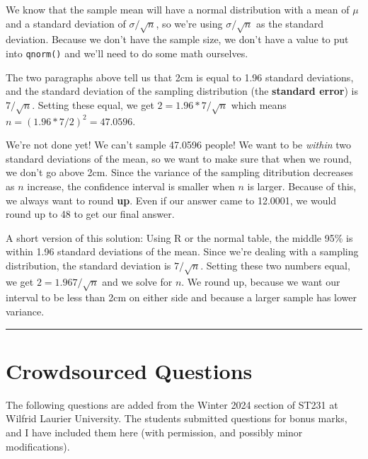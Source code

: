 \documentclass[
  letterpaper,
  DIV=11,
  numbers=noendperiod,
  oneside]{scrreprt}
\begin{document}
We know that the sample mean will have a normal distribution with a mean
of \(\mu\) and a standard deviation of \(\sigma/\sqrt{n}\), so we're
using \(\sigma/\sqrt{n}\) as the standard deviation. Because we don't
have the sample size, we don't have a value to put into \texttt{qnorm()}
and we'll need to do some math ourselves.

The two paragraphs above tell us that 2cm is equal to 1.96 standard
deviations, and the standard deviation of the sampling distribution (the
\textbf{standard error}) is \(7/\sqrt{n}\). Setting these equal, we get
\(2 = 1.96 *7/\sqrt{n}\) which means \(n = (1.96 * 7/2)^2 = 47.0596\).

We're not done yet! We can't sample 47.0596 people! We want to be
\emph{within} two standard deviations of the mean, so we want to make
sure that when we round, we don't go above 2cm. Since the variance of
the sampling ditribution decreases as \(n\) increase, the confidence
interval is smaller when \(n\) is larger. Because of this, we always
want to round \textbf{up}. Even if our answer came to 12.0001, we would
round up to 48 to get our final answer.

A short version of this solution: Using R or the normal table, the
middle 95\% is within 1.96 standard deviations of the mean. Since we're
dealing with a sampling distribution, the standard deviation is
\(7/\sqrt{n}\). Setting these two numbers equal, we get
\(2 = 1.967/\sqrt{n}\) and we solve for \(n\). We round up, because we
want our interval to be less than 2cm on either side and because a
larger sample has lower variance.

\begin{center}\rule{0.5\linewidth}{0.5pt}\end{center}

\hypertarget{crowdsourced-questions-5}{%
\section{Crowdsourced Questions}\label{crowdsourced-questions-5}}

The following questions are added from the Winter 2024 section of ST231
at Wilfrid Laurier University. The students submitted questions for
bonus marks, and I have included them here (with permission, and
possibly minor modifications).
\end{document}
